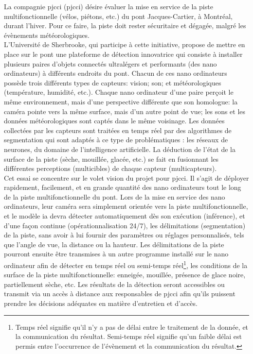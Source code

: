 ﻿\noindent La compagnie \acrlong{pjcci} (\acrshort{pjcci}) désire évaluer la mise en service de la piste multifonctionnelle (vélos, piétons, etc.) du pont Jacques-Cartier, à Montréal, durant l'hiver. Pour ce faire, la piste doit rester sécuritaire et dégagée, malgré les évènements météorologiques.
\vspace{\baselineskip}
\\
\noindent L'Université de Sherbrooke, qui participe à cette initiative, propose de mettre en place sur le pont une plateforme de détection innovatrice qui consiste à installer plusieurs paires d'objets connectés ultralégers et performants (des nano ordinateurs) à différents endroits du pont. Chacun de ces nano ordinateurs possède trois différents types de capteurs: vision; son; et météorologiques (température, humidité, etc.). Chaque nano ordinateur d'une paire perçoit le même environnement, mais d'une perspective différente que son homologue: la caméra pointe vers la même surface, mais d'un autre point de vue; les sons et les données météorologiques sont captés dans le même voisinage. Les données collectées par les capteurs sont traitées en temps réel par des algorithmes de segmentation qui sont adaptés à ce type de problématiques : les réseaux de neurones, du domaine de l'intelligence artificielle. La déduction de l'état de la surface de la piste (sèche, mouillée, glacée, etc.) se fait en fusionnant les différentes perceptions (multicibles) de chaque capteur (multicapteurs).
\vspace{\baselineskip}
\\
\noindent Cet essai se concentre sur le volet vision du projet pour \acrshort{pjcci}. Il s'agit de déployer rapidement, facilement, et en grande quantité  des nano ordinateurs tout le long de la piste multifonctionnelle du pont. Lors de la mise en service des nano ordinateurs, leur caméra sera simplement orientée vers la piste multifonctionnelle, et le modèle \acrshort{ia} devra détecter automatiquement dès son exécution (inférence), et d'une façon continue (opérationnalisation 24/7), les délimitations (segmentation) de la piste, sans avoir à lui fournir des paramètres ou réglages personnalisés, tels que l'angle de vue, la distance ou la hauteur. Les délimitations de la piste pourront ensuite être transmises à un autre programme installé sur le nano ordinateur afin de détecter en temps réel ou semi-temps réel\footnote{Temps réel signifie qu'il n'y a pas de délai entre le traitement de la donnée, et la communication du résultat. Semi-temps réel signifie qu'un faible délai est permis entre l'occurrence de l'évènement et la communication du résultat.}, les conditions de la surface de la piste multifonctionnelle: enneigée, mouillée, présence de glace noire, partiellement sèche, etc. Les résultats de la détection seront accessibles ou transmit via un accès à distance aux responsables de \acrshort{pjcci} afin qu'ils puissent prendre les décisions adéquates en matière d'entretien et d'accès. 
